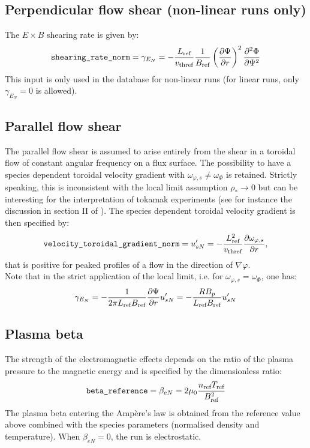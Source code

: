 \documentclass[a4paper]{report}
\begin{document}
\subsection{Perpendicular flow shear (non-linear runs only)} \label{sec:exb}
The $E\times B$ shearing rate is given by:
$$\texttt{shearing\_rate\_norm}=\gamma_{E_N}=-\frac{L_{\textrm{ref}}}{v_\textrm{thref}}\frac{1}{B_{\textrm{ref}}}\left(\frac{\partial \Psi}{\partial r}\right)^2\frac{\partial^2 \Phi}{\partial \Psi^2}$$
This input is only used in the database for non-linear runs (for linear runs, only $\gamma_{E_N}=0$ is allowed).
\subsection{Parallel flow shear} \label{sec:dvdr}
The parallel flow shear is assumed to arise entirely from the shear in a toroidal flow of constant angular frequency on a flux surface. The possibility to have a species dependent toroidal velocity gradient with $\omega_{\varphi,s}\neq \omega_\Phi$ is retained. Strictly speaking, this is inconsistent with the local limit assumption $\rho_*\rightarrow 0$ but can be interesting for the interpretation of tokamak experiments (see for instance the discussion in section II of \cite{Camenen:PoP2016}). The species dependent toroidal velocity gradient is then specified by: 
$$\texttt{velocity\_toroidal\_gradient\_norm}=u'_{sN}=-\frac{L_{\textrm{ref}}^2}{v_\textrm{thref}}\frac{\partial \omega_{\varphi,s}}{\partial r},$$
that is positive for peaked profiles of a flow in the direction of $\nabla \varphi$.\\
Note that in the strict application of the local limit, i.e. for $\omega_{\varphi,s}=\omega_\Phi$, one has:
$$\gamma_{E_N}= - \frac{1}{2\pi L_{\textrm{ref}} B_{\textrm{ref}}}\frac{\partial \Psi}{\partial r} u'_{sN} = - \frac{RB_p}{L_{\textrm{ref}} B_{\textrm{ref}}} u'_{sN}$$
\subsection{Plasma beta} \label{em:beta}
The strength of the electromagnetic effects depends on the ratio of the plasma pressure to the magnetic energy and is specified by the dimensionless ratio:
\begin{equation}
\texttt{beta\_reference}=\beta_{eN} = 2\mu_0 \frac{n_{\textrm{ref}} T_{\textrm{ref}}}{B_{\textrm{ref}}^2}
\end{equation}
The plasma beta entering the Amp\`ere's law is obtained from the reference value above combined with the species parameters (normalised density and temperature).
When $\beta_{eN}=0$, the run is electrostatic. 
\end{document}
